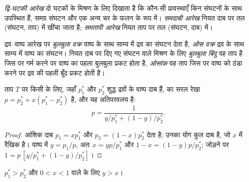 \begin{definition}[द्वि-घटकी आरेख]\label{def:b2:liquid-vapour-diagrams:binary-diagram}
\emph{द्वि-घटकी आरेख} दो घटकों के मिश्रण के लिए
दिखाता है कि कौन-सी प्रावस्थाएँ किन संघटनों के साथ उपस्थित हैं, समग्र संघटन
और एक अन्य चर के फलन के रूप में।
\emph{समदाबी आरेख} नियत दाब पर तल
(संघटन, ताप) में खींचा जाता है; \emph{समतापी
आरेख} नियत ताप पर तल (संघटन, दाब) में।
\end{definition}

\begin{definition}[बुलबुला वक्र और ओस वक्र]\label{def:b2:liquid-vapour-diagrams:bubble-dew}
द्रव--वाष्प आरेख पर \emph{बुलबुला वक्र} वाष्प के साथ
साम्य में द्रव का संघटन देता है, \emph{ओस
वक्र} द्रव के साथ साम्य में वाष्प का संघटन। नियत दाब पर दिए गए
संघटन वाले मिश्रण के लिए \emph{बुलबुला
बिंदु} वह ताप है जिस पर गर्म करने पर वाष्प का पहला बुलबुला
प्रकट होता है, \emph{ओसांक} वह
ताप जिस पर वाष्प को ठंडा करने पर द्रव की पहली बूँद प्रकट होती है।
\end{definition}

\begin{proposition}[आदर्श वक्र]\label{prop:b2:liquid-vapour-diagrams:ideal-curves}
ताप $T$ पर किसी  के लिए, जहाँ $p_1^*$ और $p_2^*$ शुद्ध द्रवों के वाष्प
दाब हैं,  का 
सरल रेखा $p = p_2^* + x(p_1^* - p_2^*)$ है, और  यह
अतिपरवलय है:
\[
  p = \frac{1}{y/p_1^* + (1 - y)/p_2^*} .
\]
\end{proposition}

\begin{proof}
 आंशिक दाब $p_1 = xp_1^*$ और $p_2 = (1 -
x)p_2^*$ देता है; उनका योग कुल दाब है, जो $x$ में रैखिक है। वाष्प में
$y = p_1/p$, अतः $x = yp/p_1^*$ और $1 - x = (1 - y)p/p_2^*$; जोड़ने पर
$1 = p\,[y/p_1^* + (1 - y)/p_2^*]$।
\end{proof}

\begin{proposition}[वाष्प अधिक वाष्पशील घटक में समृद्ध होती है]\label{prop:b2:liquid-vapour-diagrams:richer}
$p_1^* > p_2^*$ और $0 < x < 1$ वाले  के लिए $y > x$।
\end{proposition}

